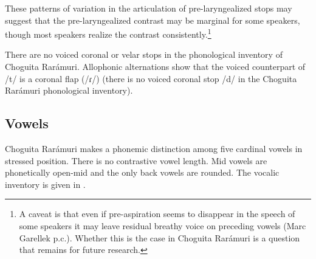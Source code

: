     \label{ex: laryngeal neutralizationa}
        \label{ex: laryngeal neutralizationb}
                \label{ex: laryngeal neutralizationc}
        \z
\z

These patterns of variation in the articulation of pre-laryngealized stops may suggest that the pre-laryngealized contrast may be marginal for some speakers, though most speakers realize the contrast consistently.\footnote{A caveat is that even if pre-aspiration seems to disappear in the speech of some speakers it may leave residual breathy voice on preceding vowels (Marc Garellek p.c.). Whether this is the case in Choguita Rarámuri is a question that remains for future research.}

There are no voiced coronal or velar stops in the phonological inventory of Choguita Rarámuri. Allophonic alternations show that the voiced counterpart of /t/ is a coronal flap (/ɾ/) (there is no voiced coronal stop /d/ in the Choguita Rarámuri phonological inventory).

\subsection{Vowels}
\label{sec: vowels}
Choguita Rarámuri makes a phonemic distinction among five cardinal vowels in stressed position. There is no contrastive vowel length. Mid vowels are phonetically open-mid and the only back vowels are rounded. The vocalic inventory is given in .

